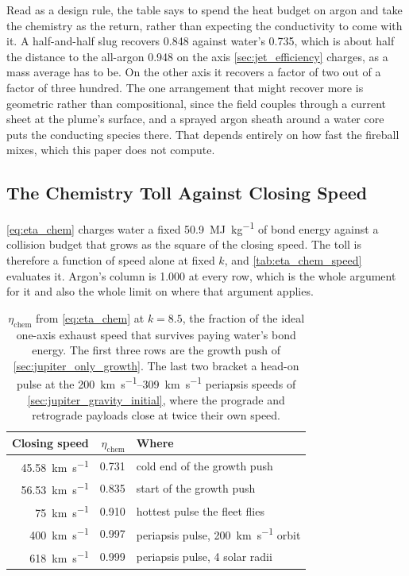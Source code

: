 \documentclass{article}
\begin{document}
Read as a design rule, the table says to spend the heat budget on argon and take the chemistry as the return, rather than expecting the conductivity to come with it. A half-and-half slug recovers \num{0.848} against water's \num{0.735}, which is about half the distance to the all-argon \num{0.948} on the axis \autoref{sec:jet_efficiency} charges, as a mass average has to be. On the other axis it recovers a factor of two out of a factor of three hundred. The one arrangement that might recover more is geometric rather than compositional, since the field couples through a current sheet at the plume's surface, and a sprayed argon sheath around a water core puts the conducting species there. That depends entirely on how fast the fireball mixes, which this paper does not compute.

\subsection*{The Chemistry Toll Against Closing Speed}
\autoref{eq:eta_chem} charges water a fixed \SI{50.9}{\mega\joule\per\kilogram} of bond energy against a collision budget that grows as the square of the closing speed. The toll is therefore a function of speed alone at fixed $k$, and \autoref{tab:eta_chem_speed} evaluates it. Argon's column is \num{1.000} at every row, which is the whole argument for it and also the whole limit on where that argument applies.

\begin{table}[!htpb]
    \centering
    \caption{$\eta_{\mathrm{chem}}$ from \autoref{eq:eta_chem} at $k = 8.5$, the fraction of the ideal one-axis exhaust speed that survives paying water's bond energy. The first three rows are the growth push of \autoref{sec:jupiter_only_growth}. The last two bracket a head-on pulse at the \SIrange{200}{309}{\kilo\meter\per\second} periapsis speeds of \autoref{sec:jupiter_gravity_initial}, where the prograde and retrograde payloads close at twice their own speed.}
    \label{tab:eta_chem_speed}
    \begin{tabular}{|r|r|l|}\hline
        \textbf{Closing speed} & \textbf{$\eta_{\mathrm{chem}}$} & \textbf{Where} \\\hline
        \SI{45.58}{\kilo\meter\per\second} & \num{0.731} & cold end of the growth push \\\hline
        \SI{56.53}{\kilo\meter\per\second} & \num{0.835} & start of the growth push \\\hline
        \SI{75}{\kilo\meter\per\second} & \num{0.910} & hottest pulse the fleet flies \\\hline
        \SI{400}{\kilo\meter\per\second} & \num{0.997} & periapsis pulse, \SI{200}{\kilo\meter\per\second} orbit \\\hline
        \SI{618}{\kilo\meter\per\second} & \num{0.999} & periapsis pulse, 4 solar radii \\\hline
    \end{tabular}
\end{table}
\end{document}
